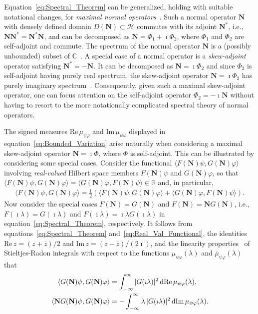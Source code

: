 \documentclass[leqno,onefignum,onetabnum]{siamltex1213}
\renewcommand{\d}{\mathrm{d}}
\newcommand\Real{\mbox{Re}\,} %
\newcommand\Imag{\mbox{Im}\,} %
\newcommand{\Nb}{\mathbf{N}}
\newcommand{\Hs}{\mathscr{H}}
\begin{document}
Equation~\eqref{eq:Spectral_Theorem} can be generalized, holding with
suitable notational changes, for \emph{maximal normal
  operators}~\cite{Stone:64}. Such a normal operator $\Nb$ with densely
defined domain $D(\Nb)\subset\Hs$ commutes with its adjoint $\Nb^*$, i.e.,
$\Nb\Nb^*=\Nb^*\Nb$, and can be decomposed as $\Nb=\Phi_1+\imath\Phi_2$, where
$\Phi_1$ and $\Phi_2$ are self-adjoint and commute. The spectrum of the
normal operator $\Nb$ is 
a (possibly unbounded) subset of $\mathbb{C}$~\cite{Stone:64}. A
special case of a normal operator is a \emph{skew-adjoint} operator
satisfying $\Nb^*=-\Nb$. It can be decomposed as $\Nb=\imath\Phi_2$ and since
$\Phi_2$ is self-adjoint having purely real spectrum, the skew-adjoint
operator $\Nb=\imath\Phi_2$ has purely imaginary
spectrum~\cite{Stone:64}. Consequently, given such a maximal
skew-adjoint operator, one can focus attention on the self-adjoint
operator $\Phi_2=-\imath\Nb$ without having to resort to the more notationally
complicated spectral theory of normal operators.





The signed measures $\Real\mu_{\psi\varphi}$ and $\Imag\mu_{\psi\varphi}$ displayed in
equation~\eqref{eq:Bounded_Variation} arise naturally when considering
a maximal skew-adjoint operator $\Nb=\imath\Phi$, where $\Phi$ is
self-adjoint. This can be illustrated by considering some special
cases. Consider the functional $\langle F(\Nb)\psi,G(\Nb)\varphi\rangle$ involving
\emph{real-valued} Hilbert space members $F(\Nb)\psi$ and $G(\Nb)\varphi$, so
that $\langle F(\Nb)\psi,G(\Nb)\varphi\rangle=\langle G(\Nb)\varphi,F(\Nb)\psi\rangle\in\mathbb{R}$ and, in
particular, 
%
\begin{align}\label{eq:Real_Val_Functional}
  \langle F(\Nb)\psi,G(\Nb)\varphi\rangle=\frac{1}{2}(\langle F(\Nb)\psi,G(\Nb)\varphi\rangle+\langle G(\Nb)\varphi,F(\Nb)\psi\rangle).
\end{align}
%
Now consider the special cases $F(\Nb)=G(\Nb)$ and $F(\Nb)=\Nb G(\Nb)$,
i.e., $F(\imath\lambda)=G(\imath\lambda)$ and $F(\imath\lambda)=\imath\lambda G(\imath\lambda)$ in
equation~\eqref{eq:Spectral_Theorem}, respectively. It follows 
from equations~\eqref{eq:Spectral_Theorem}
and~\eqref{eq:Real_Val_Functional}, the identities
$\Real z=(z+\overline{z})/2$ and $\Imag z=(z-\overline{z})/(2\imath)$, and
the linearity properties~\cite{Stone:64} of Stieltjes-Radon integrals
with respect to the functions $\mu_{\psi\varphi}(\lambda)$ and $\overline{\mu}_{\psi\varphi}(\lambda)$ that
%
\begin{align}\label{eq:Real_Imag_mu_Reps}
  \langle G(\Nb)\psi,G(\Nb)\varphi\rangle&=\int_{-\infty}^\infty|G(\imath\lambda)|^2\,\d\Real\mu_{\psi\varphi}(\lambda),
  \\
   \langle\Nb G(\Nb)\psi,G(\Nb)\varphi\rangle&=-\int_{-\infty}^\infty\lambda\,|G(\imath\lambda)|^2\,\d\Imag\mu_{\psi\varphi}(\lambda).
   \notag
\end{align}
%
\end{document}
